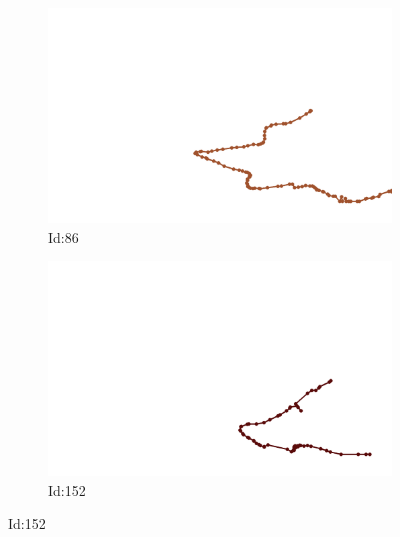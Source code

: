 \documentclass[12pt,twoside]{report}
\begin{document}
\begin{figure}
\centering
\begin{subfigure}[b]{0.20\textwidth}
\centering
\includegraphics[width=\textwidth]{../../trajectories/86.png}
\caption{Id:86}
\end{subfigure}
\begin{subfigure}[b]{0.20\textwidth}
\centering
\includegraphics[width=\textwidth]{../../trajectories/152.png}
\caption{Id:152}
\end{subfigure}
\end{figure}
\end{document}
